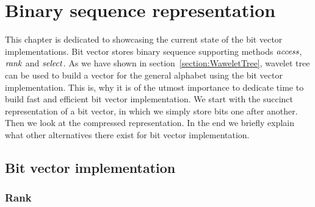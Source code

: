 \chapter{Binary sequence representation}
\label{kap:kap2}

This chapter is dedicated to showcasing the current state of the bit vector
implementations. Bit vector stores binary sequence supporting methods $\mathit{access}$,
$\mathit{rank}$ and $\mathit{select}$. As we have shown in section~\ref{section:WaweletTree}, wavelet
tree can be used to build a vector for the general alphabet using the bit vector
implementation. This is, why it is of the utmost importance to dedicate time
to build fast and efficient bit vector implementation. We start with the
succinct representation of a bit vector, in which we simply store bits one
after another. Then we look at the compressed representation. In the end we
briefly explain what other alternatives there exist for bit vector implementation.

\section{Bit vector implementation}

\subsection{Rank}
\label{section:rank}

